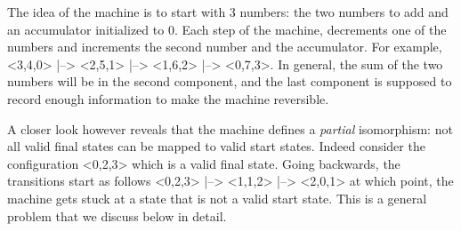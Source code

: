 \documentclass{llncs}
\begin{document}
\vspace{-20pt}
\begin{small}
\begin{multicols}{2}  

\end{multicols}
\vspace{-15pt}
\end{small}

The idea of the machine is to start with 3 numbers: the two numbers to add
and an accumulator initialized to 0. Each step of the machine, decrements one
of the numbers and increments the second number and the accumulator. For
example, {{<3,4,0> |--> <2,5,1> |--> <1,6,2> |--> <0,7,3>}}. In general, the
sum of the two numbers will be in the second component, and the last
component is supposed to record enough information to make the machine
reversible.

A closer look however reveals that the machine defines a
\emph{partial} isomorphism: not all valid final states can be mapped
to valid start states. Indeed consider the configuration {{<0,2,3>}}
which is a valid final state. Going backwards, the transitions start
as follows {{<0,2,3> |--> <1,1,2> |--> <2,0,1>}} at which point, the
machine gets stuck at a state that is not a valid start state. This 
is a general problem that we discuss below in detail. 
\end{document}
